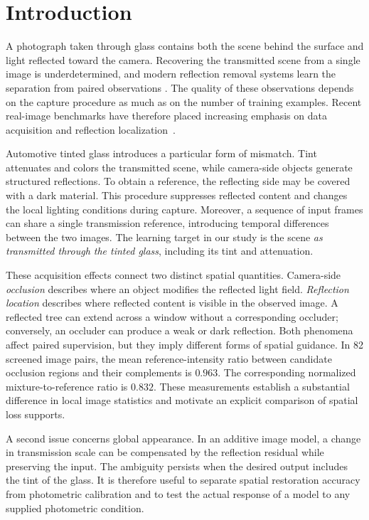 \section{Introduction}
\label{sec:intro}

A photograph taken through glass contains both the scene behind the
surface and light reflected toward the camera. Recovering the transmitted
scene from a single image is underdetermined, and modern reflection
removal systems learn the separation from paired observations
\cite{li2020ibcln,hu2023dsrnet,zhao2025rdnet}. The quality of these
observations depends on the capture procedure as much as on the number
of training examples. Recent real-image benchmarks have therefore
placed increasing emphasis on data acquisition and reflection
localization~\cite{zhu2024rrw,openrr2025}.



Automotive tinted glass introduces a particular form of mismatch.
Tint attenuates and colors the transmitted scene, while camera-side
objects generate structured reflections. To obtain a reference,
the reflecting side may be covered with a dark material. This
procedure suppresses reflected content and changes the local
lighting conditions during capture. Moreover, a sequence of input
frames can share a single transmission reference, introducing
temporal differences between the two images. The learning target
in our study is the scene \emph{as transmitted through the tinted
glass}, including its tint and attenuation.

These acquisition effects connect two distinct spatial quantities.
Camera-side \emph{occlusion} describes where an object modifies the
reflected light field. \emph{Reflection location} describes where
reflected content is visible in the observed image. A reflected
tree can extend across a window without a corresponding occluder;
conversely, an occluder can produce a weak or dark reflection.
Both phenomena affect paired supervision, but they imply different
forms of spatial guidance. In 82 screened image pairs, the mean
reference-intensity ratio between candidate occlusion regions and
their complements is $0.963$. The corresponding normalized
mixture-to-reference ratio is $0.832$. These measurements establish
a substantial difference in local image statistics and motivate
an explicit comparison of spatial loss supports.

A second issue concerns global appearance. In an additive image
model, a change in transmission scale can be compensated by the
reflection residual while preserving the input. The ambiguity
persists when the desired output includes the tint of the glass.
It is therefore useful to separate spatial restoration accuracy
from photometric calibration and to test the actual response of
a model to any supplied photometric condition.

